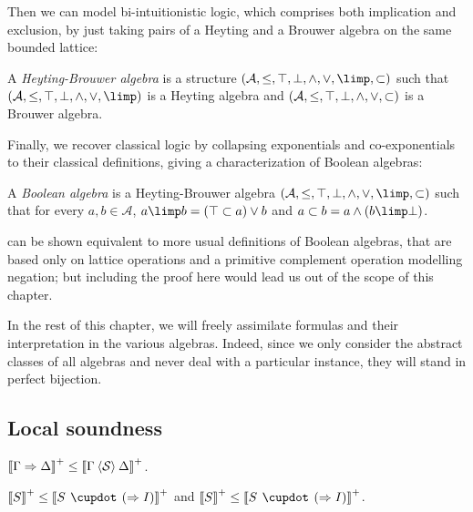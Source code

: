 Then we can model bi-intuitionistic logic, which comprises both implication and
exclusion, by just taking pairs of a Heyting and a Brouwer algebra on the same
bounded lattice:

\begin{definition}
  A \emph{Heyting-Brouwer algebra} is a structure $(\mathcal{A}, \sement, \ltop,
  \lbot, \lmeet, \ljoin, \lexp, \lcoexp)$ such that $(\mathcal{A}, \sement,
  \ltop, \lbot, \lmeet, \ljoin, \lexp)$ is a Heyting algebra and $(\mathcal{A},
  \leq, \top, \bot, \land, \lor, \subset)$ is a Brouwer algebra.
\end{definition}

Finally, we recover classical logic by collapsing exponentials and
co-exponentials to their classical definitions, giving a characterization of
Boolean algebras:

\begin{definition}
  A \emph{Boolean algebra} is a Heyting-Brouwer algebra $(\mathcal{A}, \sement,
  \ltop, \lbot, \lmeet, \ljoin, \lexp, \lcoexp)$ such that for every $a, b \in
  \mathcal{A}$, $a \lexp b = (\ltop \lcoexp a) \ljoin b$ and $a \lcoexp b = a
  \lmeet (b \lexp \bot)$.
\end{definition}

\begin{remark}
 can be shown equivalent to more
usual definitions of Boolean algebras, that are based only on lattice operations
and a primitive complement operation modelling negation; but including the proof
here would lead us out of the scope of this chapter.
\end{remark}

In the rest of this chapter, we will freely assimilate formulas and their
interpretation in the various algebras. Indeed, since we only consider the
abstract classes of all algebras and never deal with a particular instance,
they will stand in perfect bijection.

\subsection{Local soundness}

\begin{lemma}[Sharing]
  $\left\llbracket \Gamma \Rightarrow \Delta \right\rrbracket^+ \leq \left\llbracket \Gamma \mathbin{\langle \mathcal{S} \rangle} \Delta \right\rrbracket^+$.
\end{lemma}

\begin{lemma}[Weakening]
  $\psint{S} \sement \psint{S \mix (\seq I)}$ and $\psint{S} \sement \psint{S
  \mix (\seq I)}$.
\end{lemma}

